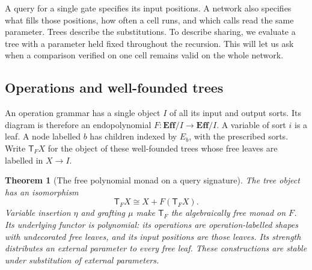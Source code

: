 \documentclass[11pt,a4paper]{article}
\newtheorem{theorem}{Theorem}[section]
\theoremstyle{definition}
\theoremstyle{remark}\newaliascnt{remark}{theorem}
\newcommand{\E}{\mathbf{Eff}}
\numberwithin{equation}{section}
\begin{document}
A query for a single gate specifies its input positions. A network also specifies what fills those positions, how often a cell runs, and which calls read the same parameter. Trees describe the substitutions. To describe sharing, we evaluate a tree with a parameter held fixed throughout the recursion. This will let us ask when a comparison verified on one cell remains valid on the whole network.

\subsection{Operations and well-founded trees}

An operation grammar has a single object $I$ of all its input and output
sorts. Its diagram is therefore an endopolynomial
$F:\E/I\to\E/I$. A variable of sort $i$ is a leaf. A node labelled
$b$ has children indexed by $E_b$, with the prescribed sorts. Write
$\mathsf T_FX$ for the object of these well-founded trees whose free
leaves are labelled in $X\to I$.
\begin{theorem}[The free polynomial monad on a query signature]
\label{poly:thm:free}
The tree object has an isomorphism
\[
 \mathsf T_FX\cong X+F(\mathsf T_FX).
\]
Variable insertion $\eta$ and grafting $\mu$ make $\mathsf T_F$ the
algebraically free monad on $F$. Its underlying functor is polynomial:
its operations are operation-labelled shapes with undecorated free
leaves, and its input positions are those leaves. Its strength distributes an external parameter to
every free leaf. These constructions are stable under substitution of
external parameters.
\end{theorem}
\end{document}
